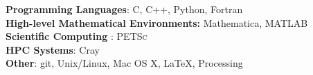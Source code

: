 \textbf{Programming Languages}: C, C++, Python, Fortran \\
\textbf{High-level Mathematical Environments:} Mathematica, MATLAB\\
\textbf{Scientific Computing} : \textsc{PETSc} \\
\textbf{HPC Systems}: Cray \\
\textbf{Other}: git, Unix/Linux, Mac OS X, \LaTeX, Processing

